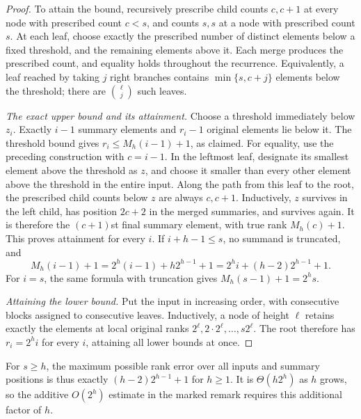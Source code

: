\begin{proof}
    To attain the bound, recursively prescribe child counts $c,c+1$
    at every node with prescribed count $c<s$, and counts $s,s$
    at a node with prescribed count $s$. At each leaf, choose exactly
    the prescribed number of distinct elements below a fixed
    threshold, and the remaining elements above it. Each merge
    produces the prescribed count, and equality holds throughout the
    recurrence. Equivalently, a leaf reached by taking $j$ right
    branches contains $\min\{s,c+j\}$ elements below the threshold;
    there are $\binom{\ell}{j}$ such leaves.

    \smallskip\noindent\emph{The exact upper bound and its attainment.}
    Choose a threshold immediately below $z_i$. Exactly $i-1$
    summary elements and $r_i-1$ original elements lie below it.
    The threshold bound gives $r_i\leq M_h(i-1)+1$, as claimed.
    For equality, use the preceding construction with $c=i-1$.
    In the leftmost leaf, designate its smallest element above the
    threshold as $z$, and choose it smaller than every other element
    above the threshold in the entire input. Along the path from
    this leaf to the root, the prescribed child counts below $z$
    are always $c,c+1$. Inductively, $z$ survives in the left child,
    has position $2c+2$ in the merged summaries, and survives again.
    It is therefore the $(c+1)$st final summary element, with true
    rank $M_h(c)+1$. This proves attainment for every $i$.
    If $i+h-1\leq s$, no summand is truncated, and
    \begin{equation*}
        M_h(i-1)+1
        =2^h(i-1)+h2^{h-1}+1
        =2^h i+(h-2)2^{h-1}+1.
    \end{equation*}
    For $i=s$, the same formula with truncation gives
    $M_h(s-1)+1=2^h s$.

    \smallskip\noindent\emph{Attaining the lower bound.}
    Put the input in increasing order, with consecutive blocks
    assigned to consecutive leaves. Inductively, a node of height
    $\ell$ retains exactly the elements at local original ranks
    $2^\ell,2\cdot2^\ell,\ldots,s2^\ell$. The root therefore has
    $r_i=2^h i$ for every $i$, attaining all lower bounds at once.
\end{proof}

For $s\geq h$, the maximum possible rank error over all inputs and
summary positions is thus exactly $(h-2)2^{h-1}+1$ for $h\geq1$.
It is $\Theta(h2^h)$ as $h$ grows, so the additive $O(2^h)$ estimate
in the marked remark requires this additional factor of $h$.

